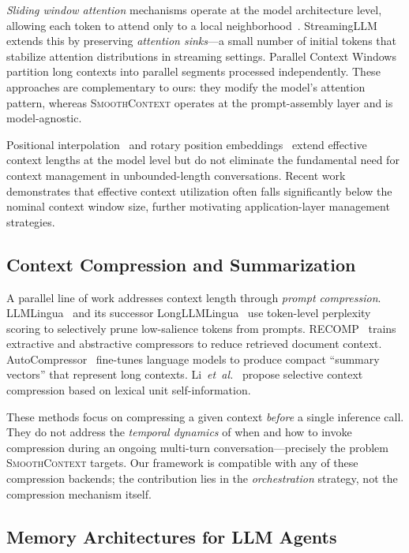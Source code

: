 \documentclass[10pt,twocolumn]{article}
\newcommand{\sys}{\textsc{SmoothContext}}
\newcommand{\etal}{\textit{et~al.}}
\begin{document}
\emph{Sliding window attention} mechanisms operate at the model architecture level, allowing each token to attend only to a local neighborhood~\cite{beltagy2020longformer}. StreamingLLM~\cite{xiao2024efficient} extends this by preserving \emph{attention sinks}---a small number of initial tokens that stabilize attention distributions in streaming settings. Parallel Context Windows~\cite{ratner2023parallel} partition long contexts into parallel segments processed independently. These approaches are complementary to ours: they modify the model's attention pattern, whereas \sys{} operates at the prompt-assembly layer and is model-agnostic.

Positional interpolation~\cite{chen2023extending} and rotary position embeddings~\cite{su2024roformer} extend effective context lengths at the model level but do not eliminate the fundamental need for context management in unbounded-length conversations. Recent work~\cite{hsieh2024ruler} demonstrates that effective context utilization often falls significantly below the nominal context window size, further motivating application-layer management strategies.

\subsection{Context Compression and Summarization}

A parallel line of work addresses context length through \emph{prompt compression}. LLMLingua~\cite{jiang2023llmlingua} and its successor LongLLMLingua~\cite{jiang2024longllmlingua} use token-level perplexity scoring to selectively prune low-salience tokens from prompts. RECOMP~\cite{xu2024recomp} trains extractive and abstractive compressors to reduce retrieved document context. AutoCompressor~\cite{chevalier2023adapting} fine-tunes language models to produce compact ``summary vectors'' that represent long contexts. Li~\etal~\cite{li2023compressing} propose selective context compression based on lexical unit self-information.

These methods focus on compressing a given context \emph{before} a single inference call. They do not address the \emph{temporal dynamics} of when and how to invoke compression during an ongoing multi-turn conversation---precisely the problem \sys{} targets. Our framework is compatible with any of these compression backends; the contribution lies in the \emph{orchestration} strategy, not the compression mechanism itself.

\subsection{Memory Architectures for LLM Agents}
\end{document}
